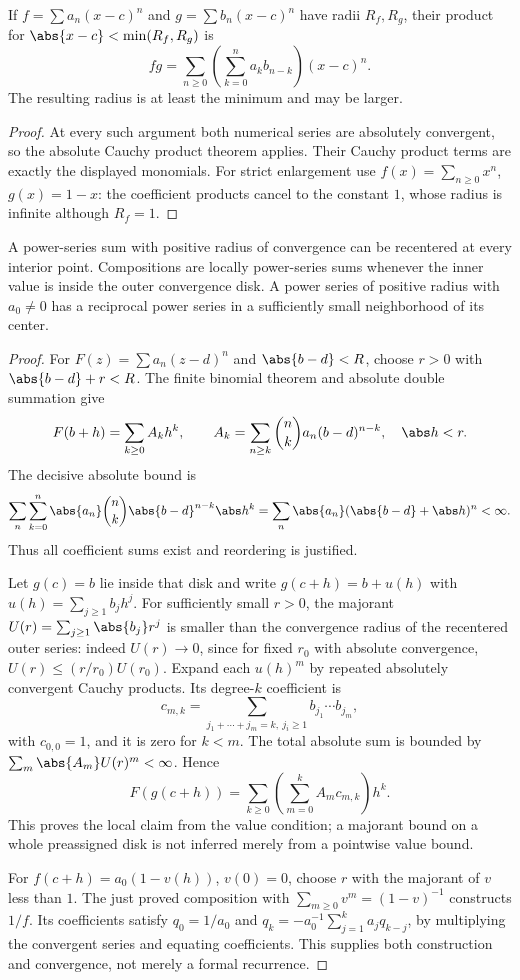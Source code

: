 \begin{theorem}
If $f=\sum a_n(x-c)^n$ and $g=\sum b_n(x-c)^n$ have radii $R_f,R_g$, their product for $\abs{x-c}<\min(R_f,R_g)$ is
\[fg=\sum_{n\geq0}\left(\sum_{k=0}^na_kb_{n-k}\right)(x-c)^n.\]
The resulting radius is at least the minimum and may be larger.
\end{theorem}
\begin{proof}
At every such argument both numerical series are absolutely convergent, so the absolute Cauchy product theorem  applies. Their Cauchy product terms are exactly the displayed monomials. For strict enlargement use $f(x)=\sum_{n\geq0}x^n$, $g(x)=1-x$: the coefficient products cancel to the constant $1$, whose radius is infinite although $R_f=1$.
\end{proof}

\begin{theorem}
A power-series sum with positive radius of convergence can be recentered at every interior point. Compositions are locally power-series sums whenever the inner value is inside the outer convergence disk. A power series of positive radius with $a_0\ne0$ has a reciprocal power series in a sufficiently small neighborhood of its center.
\end{theorem}
\begin{proof}
For $F(z)=\sum a_n(z-d)^n$ and $\abs{b-d}<R$, choose $r>0$ with $\abs{b-d}+r<R$. The finite binomial theorem and absolute double summation give
\[F(b+h)=\sum_{k\geq0}A_kh^k,\qquad A_k=\sum_{n\geq k}\binom nk a_n(b-d)^{n-k},\quad \abs h<r.\]
The decisive absolute bound is
\[\sum_n\sum_{k=0}^n\abs{a_n}\binom nk\abs{b-d}^{n-k}\abs h^k=\sum_n\abs{a_n}(\abs{b-d}+\abs h)^n<\infty.\]
Thus all coefficient sums exist and reordering is justified.

Let $g(c)=b$ lie inside that disk and write $g(c+h)=b+u(h)$ with $u(h)=\sum_{j\geq1}b_jh^j$. For sufficiently small $r>0$, the majorant $U(r)=\sum_{j\geq1}\abs{b_j}r^j$ is smaller than the convergence radius of the recentered outer series: indeed $U(r)\to0$, since for fixed $r_0$ with absolute convergence, $U(r)\leq(r/r_0)U(r_0)$. Expand each $u(h)^m$ by repeated absolutely convergent Cauchy products. Its degree-$k$ coefficient is
\[c_{m,k}=\sum_{j_1+\cdots+j_m=k,\ j_i\geq1}b_{j_1}\cdots b_{j_m},\]
with $c_{0,0}=1$, and it is zero for $k<m$. The total absolute sum is bounded by $\sum_m\abs{A_m}U(r)^m<\infty$. Hence
\[F(g(c+h))=\sum_{k\geq0}\left(\sum_{m=0}^kA_mc_{m,k}\right)h^k.\]
This proves the local claim from the value condition; a majorant bound on a whole preassigned disk is not inferred merely from a pointwise value bound.

For $f(c+h)=a_0(1-v(h))$, $v(0)=0$, choose $r$ with the majorant of $v$ less than $1$. The just proved composition with $\sum_{m\geq0}v^m=(1-v)^{-1}$ constructs $1/f$. Its coefficients satisfy $q_0=1/a_0$ and $q_k=-a_0^{-1}\sum_{j=1}^ka_jq_{k-j}$, by multiplying the convergent series and equating coefficients. This supplies both construction and convergence, not merely a formal recurrence.
\end{proof}

